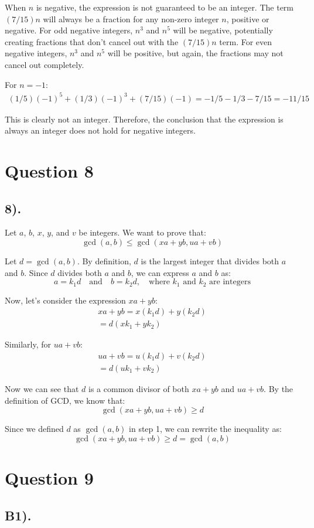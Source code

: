 \documentclass[12pt]{article}
\begin{document}
When $n$ is negative, the expression is not guaranteed to be an integer.
The term $(7/15)n$ will always be a fraction for any non-zero integer $n$, positive or negative.
For odd negative integers, $n^3$ and $n^5$ will be negative, potentially creating fractions that don't cancel out with the $(7/15)n$ term.
For even negative integers, $n^3$ and $n^5$ will be positive, but again, the fractions may not cancel out completely.

For $n = -1$:
\begin{gather*}
    (1/5){(-1)}^5 + (1/3){(-1)}^3 + (7/15)(-1) = -1/5 - 1/3 - 7/15 = -11/15
\end{gather*}

This is clearly not an integer. Therefore, the conclusion that the expression is always an integer does not hold for negative integers.

\section*{Question 8}
\subsection*{8).}
Let $a$, $b$, $x$, $y$, and $v$ be integers. We want to prove that:
\[
    \gcd(a,b) \leq \gcd(xa+yb, ua+vb)
\]

Let $d = \gcd(a,b)$. By definition, $d$ is the largest integer that divides both $a$ and $b$.
Since $d$ divides both $a$ and $b$, we can express $a$ and $b$ as:
\[
    a = k_1d \quad \text{and} \quad b = k_2d, \quad \text{where } k_1 \text{ and } k_2 \text{ are integers}
\]

Now, let's consider the expression $xa + yb$:
\begin{gather*}
    xa + yb = x(k_1d) + y(k_2d) \\
            = d(xk_1 + yk_2)
\end{gather*}

Similarly, for $ua + vb$:
\begin{gather*}
    ua + vb = u(k_1d) + v(k_2d) \\
            = d(uk_1 + vk_2)
\end{gather*}

Now we can see that $d$ is a common divisor of both $xa + yb$ and $ua + vb$.
By the definition of GCD, we know that:
\[
    \gcd(xa+yb, ua+vb) \geq d
\]

Since we defined $d$ as $\gcd(a,b)$ in step 1, we can rewrite the inequality as:
\[
    \gcd(xa+yb, ua+vb) \geq d = \gcd(a,b)
\]

\section*{Question 9}
\subsection*{B1).}
\end{document}

